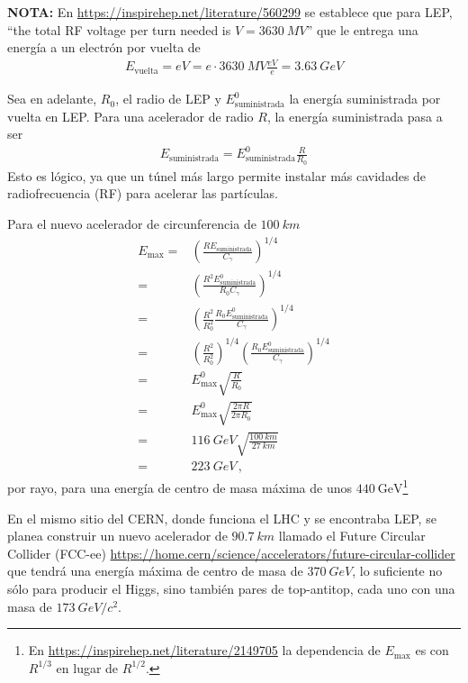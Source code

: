 \documentclass[11pt,a4paper]{book}
\begin{document}
\textbf{NOTA:} En \url{https://inspirehep.net/literature/560299} se establece que para LEP, ``the total RF voltage per turn needed is $V =\qty{3630}{MV}$'' que le entrega una energía a un electrón por vuelta de
\begin{align*}
    E_{\text{vuelta}} = e V = e\cdot \qty{3630}{MV} \frac{\unit{eV}}{e}= \qty{3.63}{GeV}
\end{align*}

Sea en adelante, $R_0$, el radio de LEP y $E^0_{\text{suministrada}}$ la energía suministrada por vuelta en LEP. Para una acelerador de radio $R$, la energía suministrada pasa a ser
\begin{align*}
    E_{\text{suministrada}} = E^0_{\text{suministrada}}\frac{R}{R_0}
\end{align*}
Esto es lógico, ya que un túnel más largo permite instalar más cavidades de radiofrecuencia (RF) para acelerar las partículas.

Para el nuevo acelerador de circunferencia de $\qty{100}{km}$
\begin{align*}
    E_{\text{max}} =&\left( \frac{R E_{\text{suministrada}} }{C_\gamma}\right)^{1/4}\\
     =& \left(\frac{R^2 E^0_{\text{suministrada}}}{R_0 C_\gamma}\right)^{1/4}\\
=& \left(\frac{R^2 }{R_0^2}\frac{R_0 E^0_{\text{suministrada}}}{ C_\gamma}\right)^{1/4}\\
=& \left(\frac{R^2 }{R_0^2}\right)^{1/4}\left(\frac{R_0 E^0_{\text{suministrada}}}{ C_\gamma}\right)^{1/4}\\
    =& E^0_{\text{max}}\sqrt{\frac{R}{R_0}}\\
    =& E^0_{\text{max}}\sqrt{\frac{2\pi R}{2\pi R_0}}\\
    =&\qty{116}{GeV}\sqrt{\frac{\qty{100}{km}}{\qty{27}{km}}}\\
    =& \qty{223}{GeV}\,,
\end{align*}
por rayo, para una energía de centro de masa máxima de unos $\qty{440}{\text{GeV}}$\footnote{En \url{https://inspirehep.net/literature/2149705} la dependencia de $E_{\text{max}}$ es con $R^{1/3}$ en lugar de $R^{1/2}$.
}

En el mismo sitio del CERN, donde funciona el LHC y se encontraba LEP, se planea construir un nuevo acelerador de $\qty{90.7}{km}$ llamado el Future Circular Collider (FCC-ee) \url{https://home.cern/science/accelerators/future-circular-collider} que tendrá una energía máxima de centro de masa de $\qty{370}{GeV}$, lo suficiente no sólo para producir el Higgs, sino también pares de top-antitop, cada uno con una masa de $\qty{173}{GeV/c^2}$.
\end{document}

